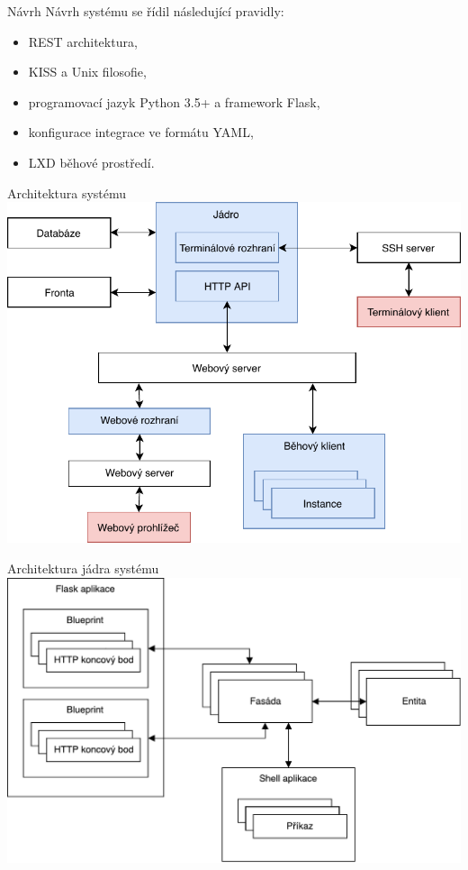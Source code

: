 \documentclass{beamer}
\begin{document}
\begin{frame}{Návrh}
Návrh systému se řídil následující pravidly:
\begin{itemize}
	\item REST architektura,
	\item KISS a Unix filosofie,
	\item programovací jazyk Python 3.5+ a framework Flask,
	\item konfigurace integrace ve formátu YAML,
	\item LXD běhové prostředí.
\end{itemize}
\end{frame}

\begin{frame}{Architektura systému}
	\hfill
	\includegraphics[height=.8\paperheight]{img/architektura_piper.pdf}
	\hfill
\end{frame}

\begin{frame}{Architektura jádra systému}
	\hfill
	\includegraphics[width=.88\paperwidth]{img/core.pdf}
	\hfill
\end{frame}
\end{document}
